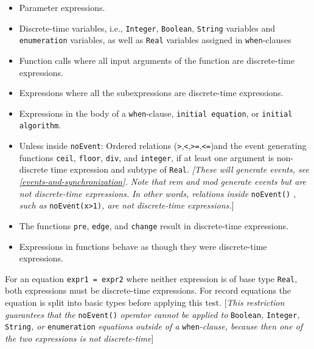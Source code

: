 \begin{itemize}
\item
  Parameter expressions.
\item
  Discrete-time variables, i.e., \lstinline[basicstyle=\ttfamily]!Integer!, \lstinline[basicstyle=\ttfamily]!Boolean!, \lstinline[basicstyle=\ttfamily]!String! variables and
  \lstinline[basicstyle=\ttfamily]!enumeration! variables, as well as \lstinline[basicstyle=\ttfamily]!Real! variables assigned in
  \lstinline[basicstyle=\ttfamily]!when!-clauses
\item
  Function calls where all input arguments of the function are
  discrete-time expressions.
\item
  Expressions where all the subexpressions are discrete-time
  expressions.
\item
  Expressions in the body of a \lstinline[basicstyle=\ttfamily]!when!-clause, \lstinline[basicstyle=\ttfamily]!initial equation!, or \lstinline[basicstyle=\ttfamily]!initial algorithm!.
\item
  Unless inside \lstinline[basicstyle=\ttfamily]!noEvent!: Ordered relations
  (\lstinline[basicstyle=\ttfamily]!>!,\lstinline[basicstyle=\ttfamily]!<!,\lstinline[basicstyle=\ttfamily]!>=!,\lstinline[basicstyle=\ttfamily]!<=!)and the event
  generating functions \lstinline[basicstyle=\ttfamily]!ceil!, \lstinline[basicstyle=\ttfamily]!floor!, \lstinline[basicstyle=\ttfamily]!div!, and \lstinline[basicstyle=\ttfamily]!integer!, if at least one
  argument is non-discrete time expression and subtype of \lstinline[basicstyle=\ttfamily]!Real!.
  \emph{{[}These will generate events, see \autoref{events-and-synchronization}. Note that
  rem and mod generate events but are not discrete-time expressions.}
  \emph{In other words, relations inside} \lstinline[basicstyle=\ttfamily]!noEvent()! \emph{, such as}
  \lstinline[basicstyle=\ttfamily]!noEvent(x>1)!\emph{, are not discrete-time
  expressions.}{]}
\item
  The functions \lstinline[basicstyle=\ttfamily]!pre!, \lstinline[basicstyle=\ttfamily]!edge!, and \lstinline[basicstyle=\ttfamily]!change! result in discrete-time
  expressions.
\item
  Expressions in functions behave as though they were discrete-time
  expressions.
\end{itemize}

For an equation \lstinline[basicstyle=\ttfamily]!expr1 = expr2! where neither expression is of base type
\lstinline[basicstyle=\ttfamily]!Real!, both expressions must be discrete-time expressions. For record
equations the equation is split into basic types before applying this
test. {[}\emph{This restriction guarantees that the} \lstinline[basicstyle=\ttfamily]!noEvent()!
\emph{operator cannot be applied to} \lstinline[basicstyle=\ttfamily]!Boolean!\emph{,} \lstinline[basicstyle=\ttfamily]!Integer!\emph{,}
\lstinline[basicstyle=\ttfamily]!String!\emph{, or} \lstinline[basicstyle=\ttfamily]!enumeration! \emph{equations outside of a} \lstinline[basicstyle=\ttfamily]!when!\emph{-clause, because
then one of the two expressions is not discrete-time}{]}

